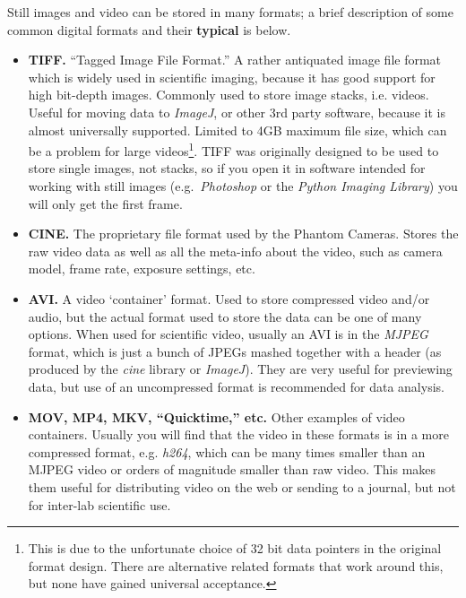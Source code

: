 \documentclass[11pt]{amsart}
\begin{document}
Still images and video can be stored in many formats; a brief description of some common digital formats and their {\bf typical} is below.
\begin{itemize}
\item {\bf TIFF.} ``Tagged Image File Format.''  A rather antiquated image file format which is widely used in scientific imaging, because it has good support for high bit-depth images.  Commonly used to store image stacks, i.e. videos.  Useful for moving data to \emph{ImageJ}, or other 3rd party software, because it is almost universally supported.  Limited to 4GB maximum file size, which can be a problem for large videos\footnote{This is due to the unfortunate choice of 32 bit data pointers in the original format design.  There are alternative related formats that work around this, but none have gained universal acceptance.}.  
TIFF was originally designed to be used to store single images, not stacks, so if you open it in software intended for working with still images (e.g.~\emph{Photoshop} or the \emph{Python Imaging Library}) you will only get the first frame.
\item {\bf CINE.} The proprietary file format used by the Phantom Cameras.  Stores the raw video data as well as all the meta-info about the video, such as camera model, frame rate, exposure settings, etc.
\item {\bf AVI.} A video `container' format.  Used to store compressed video and/or audio, but the actual format used to store the data can be one of many options.  When used for scientific video, usually an AVI is in the \emph{MJPEG} format, which is just a bunch of JPEGs mashed together with a header (as produced by the \emph{cine} library or \emph{ImageJ}).  They are very useful for previewing data, but use of an uncompressed format is recommended for data analysis. %
\item {\bf MOV, MP4, MKV, ``Quicktime,'' etc.}  Other examples of video containers.  Usually you will find that the video in these formats is in a more compressed format, e.g. \emph{h264}, which can be many times smaller than an MJPEG video or orders of magnitude smaller than raw video.  This makes them useful for distributing video on the web or sending to a journal, but not for inter-lab scientific use.

\end{itemize}
\end{document}
